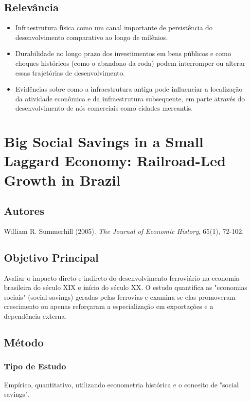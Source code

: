 \documentclass[12pt]{article}
\begin{document}
\subsection*{Relevância}
\begin{itemize}
    \item Infraestrutura física como um canal importante de persistência do desenvolvimento comparativo ao longo de milênios.
    \item Durabilidade no longo prazo dos investimentos em bens públicos e como choques históricos (como o abandono da roda) podem interromper ou alterar essas trajetórias de desenvolvimento.
    \item Evidências sobre como a infraestrutura antiga pode influenciar a localização da atividade econômica e da infraestrutura subsequente, em parte através do desenvolvimento de nós comerciais como cidades mercantis.
\end{itemize}

\newpage

\section{Big Social Savings in a Small Laggard Economy: Railroad-Led Growth in Brazil}

\subsection*{Autores}
William R. Summerhill (2005). \textit{The Journal of Economic History}, 65(1), 72-102.

\subsection*{Objetivo Principal}
Avaliar o impacto direto e indireto do desenvolvimento ferroviário na economia brasileira do século XIX e início do século XX. O estudo quantifica as "economias sociais" (social savings) geradas pelas ferrovias e examina se elas promoveram crescimento ou apenas reforçaram a especialização em exportações e a dependência externa.

\subsection*{Método}

\subsubsection*{Tipo de Estudo}
Empírico, quantitativo, utilizando econometria histórica e o conceito de "social savings".
\end{document}
